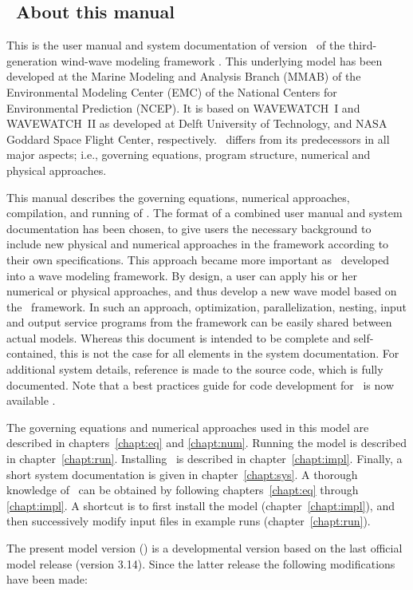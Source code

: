 \vssub
\subsection{~About this manual}
\vssub

This is the user manual and system documentation of version \WWver\ of the
third-generation wind-wave modeling framework \ww. This underlying model has
been developed at the Marine Modeling and Analysis Branch (MMAB) of the
Environmental Modeling Center (EMC) of the National Centers for Environmental
Prediction (NCEP). It is based on WAVEWATCH~I and WAVEWATCH~II as developed at
Delft University of Technology, and NASA Goddard Space Flight Center,
respectively. \ws\ differs from its predecessors in all major aspects; i.e.,
governing equations, program structure, numerical and physical approaches.

This manual describes the governing equations, numerical approaches,
compilation, and running of \ws. The format of a combined user manual and
system documentation has been chosen, to give users the necessary background
to include new physical and numerical approaches in the framework according to
their own specifications.  This approach became more important as \ws\
developed into a wave modeling framework. By design, a user can apply his or
her numerical or physical approaches, and thus develop a new wave model based
on the \ws\ framework. In such an approach, optimization, parallelization,
nesting, input and output service programs from the framework can be easily
shared between actual models.  Whereas this document is intended to be
complete and self-contained, this is not the case for all elements in the
system documentation. For additional system details, reference is made to the
source code, which is fully documented. Note that a best practices guide for
code development for \ws\ is now available \citep{tol:MMAB10a}.

The governing equations and numerical approaches used in this model are
described in chapters~\ref{chapt:eq} and \ref{chapt:num}. Running the model is
described in chapter~\ref{chapt:run}. Installing \ws\ is described in
chapter~\ref{chapt:impl}. Finally, a short system documentation is given in
chapter~\ref{chapt:sys}. A thorough knowledge of \ws\ can be obtained by
following chapters~\ref{chapt:eq} through \ref{chapt:impl}. A shortcut is to
first install the model (chapter~\ref{chapt:impl}), and then successively
modify input files in example runs (chapter~\ref{chapt:run}).

\vspace{\baselineskip} 
\noindent 
The present model version (\WWver) is a developmental version based on the
last official model release (version 3.14). Since the latter release the
following modifications have been made:

